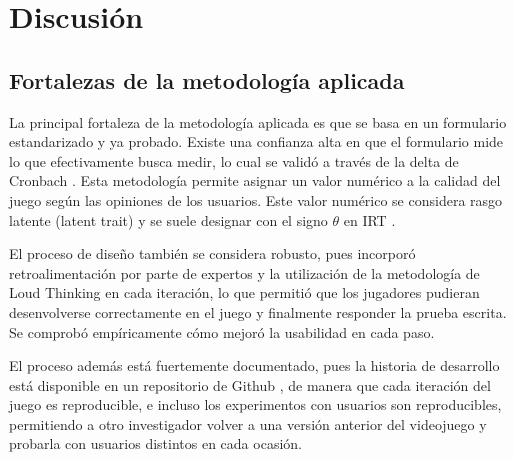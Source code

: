 \chapter{Discusión}



\section{Fortalezas de la metodología aplicada}

La principal fortaleza de la metodología aplicada es que se basa en un formulario estandarizado y ya probado. Existe una confianza alta en que el formulario mide lo que efectivamente busca medir, lo cual se validó a través de la delta de Cronbach \cite{meegaplus}. Esta metodología permite asignar un valor numérico a la calidad del juego según las opiniones de los usuarios. Este valor numérico se considera rasgo latente (latent trait) y se suele designar con el signo $\theta$ en IRT \cite{RashMeasurementTheoryAndrichMarais}.

El proceso de diseño también se considera robusto, pues incorporó retroalimentación por parte de expertos y la utilización de la metodología de Loud Thinking en cada iteración, lo que permitió que los jugadores pudieran desenvolverse correctamente en el juego y finalmente responder la prueba escrita. Se comprobó empíricamente cómo mejoró la usabilidad en cada paso.

El proceso además está fuertemente documentado, pues la historia de desarrollo está disponible en un repositorio de Github \cite{GithubRepo}, de manera que cada iteración del juego es reproducible, e incluso los experimentos con usuarios son reproducibles, permitiendo a otro investigador volver a una versión anterior del videojuego y probarla con usuarios distintos en cada ocasión.



